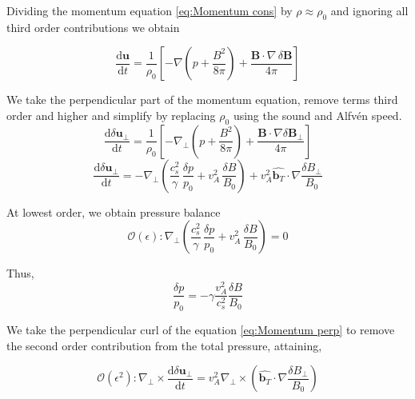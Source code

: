 Dividing the momentum equation \eqref{eq:Momentum cons} by \(\rho \approx \rho_{0}\) and ignoring all third order contributions we obtain 

\begin{equation}
    \frac{\mathrm{d} \boldsymbol{u}}{\mathrm{d} t} = \frac{1}{\rho_0} \left[-\nabla\left( p + \frac{B^2}{8\pi} \right) + \frac{\boldsymbol{B} \cdot \nabla \, \delta \boldsymbol{B}}{4\pi} \right]
    \label{eq:Momentum sim}
\end{equation}

We take the perpendicular part of the momentum equation, remove terms third order and higher and simplify by replacing \(\rho_0\) using the sound and Alfv\'en speed.
\begin{equation*}
    \frac{\mathrm{d} \delta\boldsymbol{u}_{\perp}}{\mathrm{d} t} = \frac{1}{\rho_0} \left[-\nabla_{\perp} \left( p + \frac{B^2}{8\pi} \right) + \frac{\boldsymbol{B} \cdot \nabla \delta \boldsymbol{B}_{\perp}}{4\pi} \right] 
    \label{eq:Velocity pert E}
\end{equation*}
\begin{equation}
    \frac{\mathrm{d} \delta\boldsymbol{u}_{\perp}}{\mathrm{d} t}= - \nabla_{\perp} \left(\frac{c_s^2}{\gamma}\,\frac{\delta p}{p_0}+ v_A^2\,\frac{\delta B}{B_0}\right)+ v_A^2\hat{\boldsymbol{b}_{T}} \cdot \nabla \frac{\delta B_{\perp}}{B_0}  
    \label{eq:Momentum perp}
\end{equation}

At lowest order, we obtain pressure balance 
\begin{equation*}
      \mathcal{O}(\epsilon): \nabla_{\perp} \left(\frac{c_s^2}{\gamma}\,\frac{\delta p}{p_0}+ v_A^2\,\frac{\delta B}{B_0}\right)=0
\end{equation*}

Thus,
\begin{equation}
    \frac{\delta p}{p_0}= - \gamma\frac{v_A^2}{c_s^2}\frac{\delta B}{B_0}
    \label{eq:Pressure balance}
\end{equation}

We take the perpendicular curl of the equation \eqref{eq:Momentum perp} to remove the second order contribution from the total pressure, attaining,

\begin{equation*}
      \mathcal{O}(\epsilon^2): \nabla_{\perp} \times \frac{\mathrm{d} \delta\boldsymbol{u}_{\perp}}{\mathrm{d} t} =  v_A^2 \nabla_{\perp} \times \left( \hat{\boldsymbol{b}_{T}} \cdot \nabla \frac{\delta B_{\perp}}{B_0} \right)  
\end{equation*}

